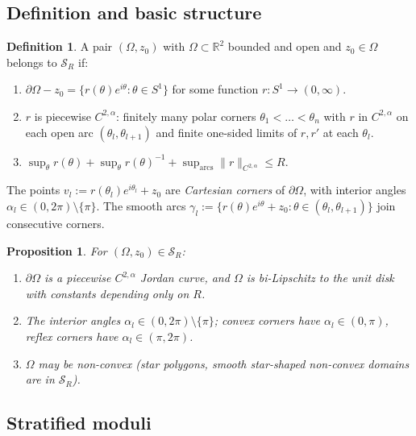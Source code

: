 \documentclass[11pt,reqno]{amsart}
\theoremstyle{plain}
\newtheorem{proposition}[theorem]{Proposition}
\theoremstyle{definition}
\newtheorem{definition}[theorem]{Definition}
\theoremstyle{remark}
\newcommand{\Reals}{\mathbb{R}}
\newcommand{\Scal}{\mathcal{S}}
\begin{document}
\subsection{Definition and basic structure}\label{ss:class-def}

\begin{definition}\label{def:star-class}
A pair $(\Omega, z_0)$ with $\Omega \subset \Reals^2$ bounded and open and $z_0 \in \Omega$ belongs to $\Scal_R$ if:
\begin{enumerate}
\item[\rm(i)] $\partial\Omega - z_0 = \{r(\theta) e^{i\theta} : \theta \in S^1\}$ for some function $r \colon S^1 \to (0, \infty)$.
\item[\rm(ii)] $r$ is piecewise $C^{2,\alpha}$: finitely many polar corners $\theta_1 < \dots < \theta_n$ with $r$ in $C^{2,\alpha}$ on each open arc $(\theta_l, \theta_{l+1})$ and finite one-sided limits of $r, r'$ at each $\theta_l$.
\item[\rm(iii)] $\sup_\theta r(\theta) + \sup_\theta r(\theta)^{-1} + \sup_{\text{arcs}}\|r\|_{C^{2,\alpha}} \leq R$.
\end{enumerate}
The points $v_l := r(\theta_l) e^{i\theta_l} + z_0$ are \emph{Cartesian corners} of $\partial\Omega$, with interior angles $\alpha_l \in (0, 2\pi) \setminus \{\pi\}$. The smooth arcs $\gamma_l := \{r(\theta) e^{i\theta} + z_0 : \theta \in (\theta_l, \theta_{l+1})\}$ join consecutive corners.
\end{definition}

\begin{proposition}\label{prop:star-properties}
For $(\Omega, z_0) \in \Scal_R$:
\begin{enumerate}
\item[\rm(i)] $\partial\Omega$ is a piecewise $C^{2,\alpha}$ Jordan curve, and $\Omega$ is bi-Lipschitz to the unit disk with constants depending only on $R$.
\item[\rm(ii)] The interior angles $\alpha_l \in (0, 2\pi) \setminus \{\pi\}$; convex corners have $\alpha_l \in (0, \pi)$, reflex corners have $\alpha_l \in (\pi, 2\pi)$.
\item[\rm(iii)] $\Omega$ may be non-convex (star polygons, smooth star-shaped non-convex domains are in $\Scal_R$).
\end{enumerate}
\end{proposition}

\subsection{Stratified moduli}\label{ss:strata-def}
\end{document}
